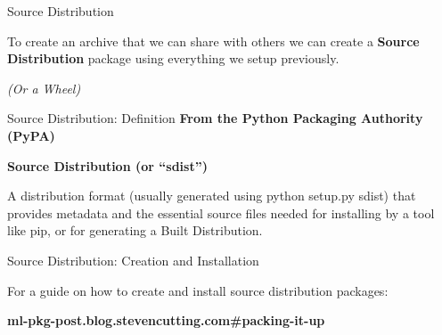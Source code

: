 \documentclass[10pt]{beamer}
\begin{document}
\begin{frame}[fragile]{Source Distribution}

  To create an archive that we can share with others we can create a \textbf{Source Distribution} package using everything we setup previously.

  \textit{(Or a Wheel)}

\end{frame}

\begin{frame}[fragile]{Source Distribution: Definition}
  \textbf{From the Python Packaging Authority (PyPA)}
  \begin{displayquote}
    \textbf{Source Distribution (or “sdist”)}
    
    A distribution format (usually generated using python setup.py sdist) that provides metadata and the essential source files needed for installing by a tool like pip, or for generating a Built Distribution.
  \end{displayquote}
\end{frame}  

\begin{frame}[fragile]{Source Distribution: Creation and Installation}

  For a guide on how to create and install source distribution packages:

  \textbf{ml-pkg-post.blog.stevencutting.com\#packing-it-up}

\end{frame}








\end{document}
